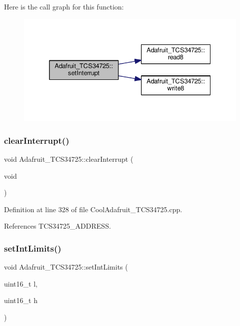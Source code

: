 Here is the call graph for this function\+:
\nopagebreak
\begin{figure}[H]
\begin{center}
\leavevmode
\includegraphics[width=332pt]{df/d54/class_adafruit___t_c_s34725_ae477b116ac93cf075be20637207aee57_cgraph}
\end{center}
\end{figure}
\mbox{\label{class_adafruit___t_c_s34725_a731a3542039027f75170b667aaf8e3a0}} 
\subsubsection{\texorpdfstring{clear\+Interrupt()}{clearInterrupt()}}
{\footnotesize\ttfamily void Adafruit\+\_\+\+T\+C\+S34725\+::clear\+Interrupt (\begin{DoxyParamCaption}\item[{void}]{ }\end{DoxyParamCaption})}



Definition at line 328 of file Cool\+Adafruit\+\_\+\+T\+C\+S34725.\+cpp.



References T\+C\+S34725\+\_\+\+A\+D\+D\+R\+E\+SS.

\mbox{\label{class_adafruit___t_c_s34725_ac17b2447df066e30d1e64fe764f88770}} 
\subsubsection{\texorpdfstring{set\+Int\+Limits()}{setIntLimits()}}
{\footnotesize\ttfamily void Adafruit\+\_\+\+T\+C\+S34725\+::set\+Int\+Limits (\begin{DoxyParamCaption}\item[{uint16\+\_\+t}]{l,  }\item[{uint16\+\_\+t}]{h }\end{DoxyParamCaption})}



